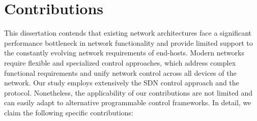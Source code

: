 

\section{Contributions} \label{sec:intro:contributions}

This dissertation contends that existing network architectures face a
significant performance bottleneck in network functionality 
and provide limited support to the constantly evolving network requirements of
end-hosts.  Modern networks require flexible and specialized control approaches,
which address complex functional requirements and unify network control across
all devices of the network. Our study employs extensively the SDN control approach and the \of protocol.
Nonetheless, the applicability of our contributions are not limited and can
easily adapt to alternative programmable control frameworks. In detail, we claim
the following specific contributions:


